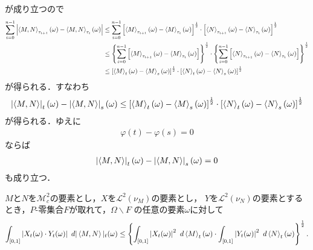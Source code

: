 	が成り立つので
	\begin{align}
		\sum_{i=0}^{n-1} \left|\inprod<M,N>_{\tau_{i+1}}(\omega) - \inprod<M,N>_{\tau_{i}}(\omega) \right|
		&\leq \sum_{i=0}^{n-1} \left[\inprod<M>_{\tau_{i+1}}(\omega) - \inprod<M>_{\tau_{i}}(\omega)\right]^{\frac{1}{2}} \cdot
		\left[\inprod<N>_{\tau_{i+1}}(\omega) - \inprod<N>_{\tau_{i}}(\omega)\right]^{\frac{1}{2}} \\
		&\leq \left\{\sum_{i=0}^{n-1} \left[\inprod<M>_{\tau_{i+1}}(\omega) - \inprod<M>_{\tau_{i}}(\omega)\right] \right\}^{\frac{1}{2}}
		\cdot \left\{\sum_{i=0}^{n-1} \left[\inprod<N>_{\tau_{i+1}}(\omega) - \inprod<N>_{\tau_{i}}(\omega)\right] \right\}^{\frac{1}{2}} \\
		&\leq \left[\inprod<M>_{t}(\omega) - \inprod<M>_{s}(\omega)\right]^{\frac{1}{2}} \cdot
		\left[\inprod<N>_{t}(\omega) - \inprod<N>_{s}(\omega)\right]^{\frac{1}{2}}
	\end{align}
	が得られる．すなわち
	\begin{align}
		\left|\inprod<M,N>\right|_{t}(\omega) - \left|\inprod<M,N>\right|_{s}(\omega)
		\leq \left[\inprod<M>_{t}(\omega) - \inprod<M>_{s}(\omega)\right]^{\frac{1}{2}} \cdot
		\left[\inprod<N>_{t}(\omega) - \inprod<N>_{s}(\omega)\right]^{\frac{1}{2}}
	\end{align}
	が得られる．ゆえに
	\begin{align}
		\varphi(t) - \varphi(s) = 0
	\end{align}
	ならば
	\begin{align}
		\left|\inprod<M,N>\right|_{t}(\omega) - \left|\inprod<M,N>\right|_{s}(\omega) = 0
	\end{align}
	も成り立つ．
	
	\begin{screen}
		\begin{thm}[確立積分に対するヘルダーの不等式]
			$M$と$N$を$\mathscr{M}_{c}^{2}$の要素とし，$X$を$\mathscr{L}^{2}(\nu_{M})$の要素とし，
			$Y$を$\mathscr{L}^{2}(\nu_{N})$の要素とするとき，$P$-零集合$F$が取れて，$\Omega \backslash F$
			の任意の要素$\omega$に対して
			\begin{align}
				\int_{[0,1]} \left|X_{t}(\omega) \cdot Y_{t}(\omega)\right|\ d|\inprod<M,N>|_{t}(\omega)
				\leq \left\{\int_{[0,1]} \left|X_{t}(\omega)\right|^{2}\ d\inprod<M>_{t}(\omega)
				\cdot \int_{[0,1]} \left|Y_{t}(\omega)\right|^{2}\ d\inprod<N>_{t}(\omega)
				\right\}^{\frac{1}{2}}.
			\end{align}
		\end{thm}
	\end{screen}
	
